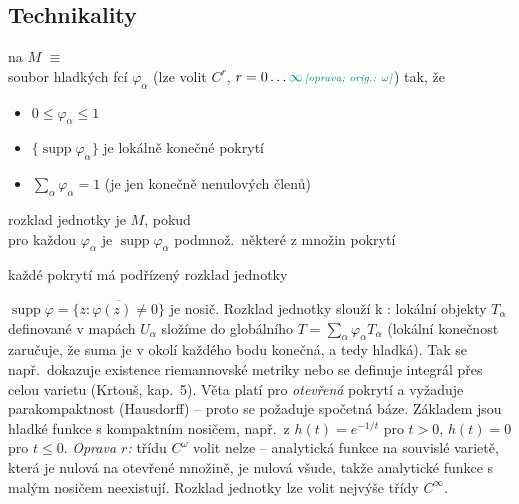 \subsection{Technikality}

\begin{definice}
 na $M$ $\equiv$ \\
\quad soubor hladkých fcí $\varphi_\alpha$ (lze volit $C^r$, $r = 0\dots\oprava{\infty}{\omega}$) tak, že
\begin{itemize}[nosep]
  \item[--] $0\leq\varphi_\alpha\leq 1$
  \item[--] $\{\operatorname{supp}\varphi_\alpha\}$ je lokálně konečné pokrytí
  \item[--] $\sum_\alpha\varphi_\alpha = 1$ \hfill (je jen konečně nenulových členů)
\end{itemize}
\end{definice}

\begin{definice}
rozklad jednotky je  $M$, pokud \\
\quad pro každou $\varphi_\alpha$ je $\operatorname{supp}\varphi_\alpha$ podmnož.\ některé z množin pokrytí
\end{definice}

\begin{veta}[Věta]
každé pokrytí má podřízený rozklad jednotky
\end{veta}

\begin{vysvetleni}
$\operatorname{supp}\varphi = \overline{\{z:\varphi(z)\neq0\}}$ je nosič. Rozklad jednotky slouží k : lokální objekty $T_\alpha$ definované v mapách $U_\alpha$ složíme do globálního $T=\sum_\alpha\varphi_\alpha T_\alpha$ (lokální konečnost zaručuje, že suma je v okolí každého bodu konečná, a tedy hladká). Tak se např.\ dokazuje existence riemannovské metriky nebo se definuje integrál přes celou varietu (Krtouš, kap.~5). Věta platí pro \emph{otevřená} pokrytí a vyžaduje parakompaktnost (Hausdorff) -- proto se požaduje spočetná báze. Základem jsou hladké  funkce s kompaktním nosičem, např.\ z $h(t)=e^{-1/t}$ pro $t>0$, $h(t)=0$ pro $t\leq0$.
\emph{Oprava $r$:} třídu $C^\omega$ volit nelze -- analytická funkce na souvislé varietě, která je nulová na otevřené množině, je nulová všude, takže analytické funkce s malým nosičem neexistují. Rozklad jednotky lze volit nejvýše třídy $C^\infty$.
\end{vysvetleni}

